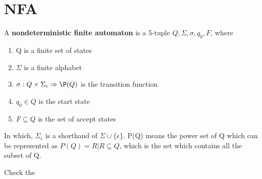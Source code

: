 \section{NFA}
\begin{definition}
    A \textbf{nondeterministic finite automaton} is a 5-tuple \(Q, \Sigma, \sigma, q_0, F\), where
    \begin{enumerate}
        \item Q is a finite set of states
        \item \(\Sigma\) is a finite alphabet 
        \item \(\sigma: Q \times \Sigma_{\epsilon} \Rightarrow \P(Q)\) is the transition function 
        \item \(q_0 \in Q\) is the start state
        \item \(F \subseteq Q\) is the set of accept states   
    \end{enumerate}  

    In which, \(\Sigma_{\epsilon}\) is a shorthand of \(\Sigma \cup \{ \epsilon \} \).  
    P(Q) means the power set of Q which can be represented as \(P(Q) = {R | R \subseteq Q}\), which is the set which contains all the subset of Q.  
\end{definition}

\begin{eg}
    Check the 
\end{eg}